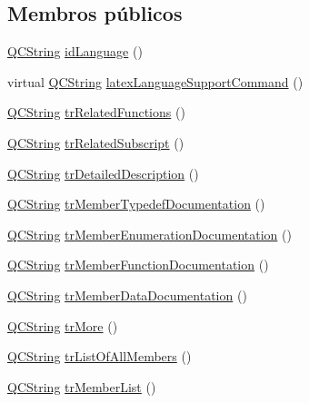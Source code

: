 \subsection*{Membros públicos}
\begin{DoxyCompactItemize}
\item 
\hyperlink{class_q_c_string}{Q\-C\-String} \hyperlink{class_translator_portuguese_a7de89df4aaf34700ff3db1d056a4f267}{id\-Language} ()
\item 
virtual \hyperlink{class_q_c_string}{Q\-C\-String} \hyperlink{class_translator_portuguese_a38858830a8a30ed8dd67927882d27ff3}{latex\-Language\-Support\-Command} ()
\item 
\hyperlink{class_q_c_string}{Q\-C\-String} \hyperlink{class_translator_portuguese_a577fc586e534023ef1529208518a994e}{tr\-Related\-Functions} ()
\item 
\hyperlink{class_q_c_string}{Q\-C\-String} \hyperlink{class_translator_portuguese_ab75e972b3134554de11b07bd64127b78}{tr\-Related\-Subscript} ()
\item 
\hyperlink{class_q_c_string}{Q\-C\-String} \hyperlink{class_translator_portuguese_abbd0ae4fd49dd1e88f99e03dd19d4e35}{tr\-Detailed\-Description} ()
\item 
\hyperlink{class_q_c_string}{Q\-C\-String} \hyperlink{class_translator_portuguese_a95ba3c5f2554643a7dc0f3408c2b493d}{tr\-Member\-Typedef\-Documentation} ()
\item 
\hyperlink{class_q_c_string}{Q\-C\-String} \hyperlink{class_translator_portuguese_acfa422f286e43d1d5c893475aca1e757}{tr\-Member\-Enumeration\-Documentation} ()
\item 
\hyperlink{class_q_c_string}{Q\-C\-String} \hyperlink{class_translator_portuguese_aea34608536223538051d2155ff75e05e}{tr\-Member\-Function\-Documentation} ()
\item 
\hyperlink{class_q_c_string}{Q\-C\-String} \hyperlink{class_translator_portuguese_abf6ac59353bc6c466642f7c1919fc3f2}{tr\-Member\-Data\-Documentation} ()
\item 
\hyperlink{class_q_c_string}{Q\-C\-String} \hyperlink{class_translator_portuguese_a2487804cd36e9995aaadb94275b58fd7}{tr\-More} ()
\item 
\hyperlink{class_q_c_string}{Q\-C\-String} \hyperlink{class_translator_portuguese_aa4f141f325a7ec448304389833d483d1}{tr\-List\-Of\-All\-Members} ()
\item 
\hyperlink{class_q_c_string}{Q\-C\-String} \hyperlink{class_translator_portuguese_a26d915bcb2e7e1e206bc6a18f05a7c66}{tr\-Member\-List} ()
\item 

\end{DoxyCompactItemize}
